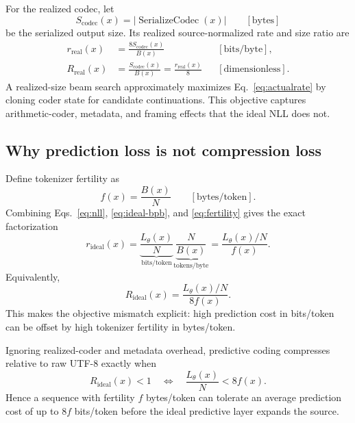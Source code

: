 \documentclass{article}
\newcommand{\Ser}{\operatorname{SerializeCodec}}
\begin{document}
For the realized codec, let
\begin{equation}
  S_{\mathrm{codec}}(x)
  = \left|\Ser(x)\right|
  \qquad [\mathrm{bytes}]
  \label{eq:serialized-bytes}
\end{equation}
be the serialized output size. Its realized source-normalized rate and size ratio are
\begin{align}
  r_{\mathrm{real}}(x)
  &= \frac{8S_{\mathrm{codec}}(x)}{B(x)}
  &&[\mathrm{bits/byte}], \label{eq:real-bpb}\\
  R_{\mathrm{real}}(x)
  &= \frac{S_{\mathrm{codec}}(x)}{B(x)}
  =\frac{r_{\mathrm{real}}(x)}{8}
  &&[\text{dimensionless}]. \label{eq:actualrate}
\end{align}
A realized-size beam search approximately maximizes Eq.~\ref{eq:actualrate} by cloning coder state for candidate continuations. This objective captures arithmetic-coder, metadata, and framing effects that the ideal NLL does not.

\subsection{Why prediction loss is not compression loss}
\label{sec:objective-mismatch}

Define tokenizer fertility as
\begin{equation}
  f(x)
  = \frac{B(x)}{N}
  \qquad [\mathrm{bytes/token}].
  \label{eq:fertility}
\end{equation}
Combining Eqs.~\ref{eq:nll}, \ref{eq:ideal-bpb}, and \ref{eq:fertility} gives the exact factorization
\begin{equation}
  r_{\mathrm{ideal}}(x)
  =
  \underbrace{\frac{L_\theta(x)}{N}}_{\text{bits/token}}
  \underbrace{\frac{N}{B(x)}}_{\text{tokens/byte}}
  =
  \frac{L_\theta(x)/N}{f(x)}.
  \label{eq:factorization}
\end{equation}
Equivalently,
\begin{equation}
  R_{\mathrm{ideal}}(x)
  =
  \frac{L_\theta(x)/N}{8f(x)}.
  \label{eq:factorization-ratio}
\end{equation}
This makes the objective mismatch explicit: high prediction cost in bits/token can be offset by high tokenizer fertility in bytes/token.

Ignoring realized-coder and metadata overhead, predictive coding compresses relative to raw UTF-8 exactly when
\begin{equation}
  R_{\mathrm{ideal}}(x)<1
  \quad\Longleftrightarrow\quad
  \frac{L_\theta(x)}{N}<8f(x).
  \label{eq:compression-boundary}
\end{equation}
Hence a sequence with fertility $f$ bytes/token can tolerate an average prediction cost of up to $8f$ bits/token before the ideal predictive layer expands the source.
\end{document}

